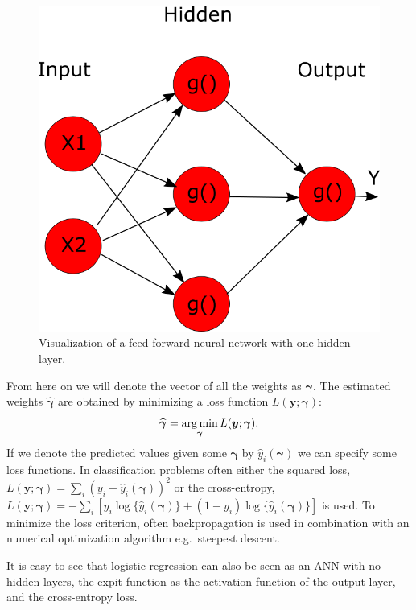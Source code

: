 \begin{figure}[!htb]
\centering
\includegraphics[scale=0.3]{VectorGraphics/ANN.png}
\caption{\label{fig:chClassificationTechniques:ANN}Visualization of a feed-forward neural network with one hidden layer.}
\end{figure}
From here on we will denote the vector of all the weights as $\bm{\gamma}$. The estimated weights $\widehat{\bm{\gamma}}$ are obtained by minimizing a loss function $L(\bm{y};\bm{\gamma})$:
\[\widehat{\bm{\gamma}} = \operatorname*{arg\,min}_{\bm{\gamma}} L(\bm{y};\bm{\gamma}).\] If we denote the predicted values given some $\bm{\gamma}$ by $\hat{y}_i(\bm{\gamma})$ we can specify some loss functions. In classification problems often either the squared loss, $L(\bm{y};\bm{\gamma}) = \sum_i (y_i - \hat{y}_i(\bm{\gamma}))^2$ or the cross-entropy, $L(\bm{y};\bm{\gamma}) = - \sum_i \left[ y_i \log \{\hat{y}_i(\bm{\gamma})\} + (1-y_i)\log \{\hat{y}_i(\bm{\gamma})\}\right]$ is used. To minimize the loss criterion, often backpropagation \parencite{rumelhart_learning_1986} is used in combination with an numerical optimization algorithm e.g.\ steepest descent. \\ 

It is easy to see that logistic regression can also be seen as an ANN with no hidden layers, the expit function as the activation function of the output layer, and the cross-entropy loss.\\

